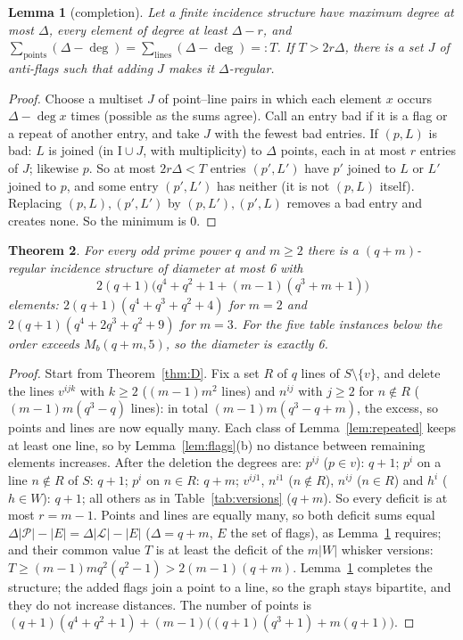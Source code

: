 \documentclass[11pt]{amsart}
\newtheorem{theorem}{Theorem}[section]
\newtheorem{lemma}[theorem]{Lemma}
\theoremstyle{definition}
\theoremstyle{remark}
\numberwithin{equation}{section}
\newcommand{\I}{\mathrel{\mathrm I}}
\newcommand{\Mb}{M_b}
\newcommand{\cL}{\mathcal L}
\newcommand{\cP}{\mathcal P}
\begin{document}
\begin{lemma}[completion]\label{lem:completion}
Let a finite incidence structure have maximum degree at most $\Delta$, every element of degree at least $\Delta-r$, and
$\sum_{\text{points}}(\Delta-\deg)=\sum_{\text{lines}}(\Delta-\deg)=:T$. If $T>2r\Delta$, there is a set $J$ of anti-flags
such that adding $J$ makes it $\Delta$-regular.
\end{lemma}

\begin{proof}
Choose a multiset $J$ of point--line pairs in which each element $x$ occurs $\Delta-\deg x$ times (possible as the sums
agree). Call an entry bad if it is a flag or a repeat of another entry, and take $J$ with the fewest bad entries. If
$(p,L)$ is bad: $L$ is joined (in $\I\cup J$, with multiplicity) to $\Delta$ points, each in at most $r$ entries of $J$;
likewise $p$. So at most $2r\Delta<T$ entries $(p',L')$ have $p'$ joined to $L$ or $L'$ joined to $p$, and some entry
$(p',L')$ has neither (it is not $(p,L)$ itself). Replacing $(p,L),(p',L')$ by $(p,L'),(p',L)$ removes a bad entry and
creates none. So the minimum is 0.
\end{proof}

\begin{theorem}\label{thm:R}
For every odd prime power $q$ and $m\ge2$ there is a $(q+m)$-regular incidence structure of diameter at most 6 with
\[
2(q+1)\bigl(q^4+q^2+1+(m-1)(q^3+m+1)\bigr)
\]
elements: $2(q+1)(q^4+q^3+q^2+4)$ for $m=2$ and $2(q+1)(q^4+2q^3+q^2+9)$ for $m=3$. For the five table instances below the
order exceeds $\Mb(q+m,5)$, so the diameter is exactly 6.
\end{theorem}

\begin{proof}
Start from Theorem~\ref{thm:D}. Fix a set $R$ of $q$ lines of $S\setminus\{v\}$, and delete the lines $v^{ijk}$ with
$k\ge2$ ($(m-1)m^2$ lines) and $n^{ij}$ with $j\ge2$ for $n\notin R$ ($(m-1)m(q^3-q)$ lines): in total
$(m-1)m(q^3-q+m)$, the excess, so points and lines are now equally many. Each class of Lemma~\ref{lem:repeated} keeps at
least one line, so by Lemma~\ref{lem:flags}(b) no distance between remaining elements increases. After the deletion the
degrees are: $p^{ij}$ ($p\in v$): $q+1$; $p^i$ on a line $n\notin R$ of $S$: $q+1$; $p^i$ on $n\in R$: $q+m$; $v^{ij1}$,
$n^{i1}$ ($n\notin R$), $n^{ij}$ ($n\in R$) and $h^i$ ($h\in W$): $q+1$; all others as in Table~\ref{tab:versions} ($q+m$).
So every deficit is at most $r=m-1$. Points and lines are equally many, so both deficit sums equal
$\Delta|\cP|-|E|=\Delta|\cL|-|E|$ ($\Delta=q+m$, $E$ the set of flags), as Lemma~\ref{lem:completion} requires; and their
common value $T$ is at least the deficit of the $m|W|$ whisker versions: $T\ge(m-1)mq^2(q^2-1)>2(m-1)(q+m)$.
Lemma~\ref{lem:completion} completes the structure; the added flags join a point to a line, so the graph stays bipartite,
and they do not increase distances. The number of points is $(q+1)(q^4+q^2+1)+(m-1)\bigl((q+1)(q^3+1)+m(q+1)\bigr)$.
\end{proof}
\end{document}
